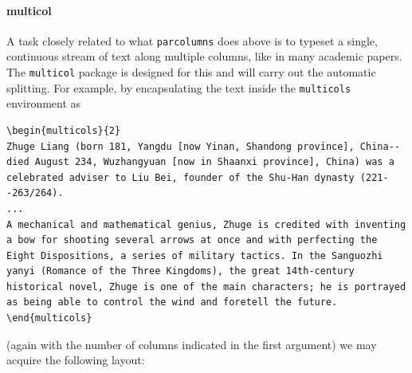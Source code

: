 \paragraph{multicol} A task closely related to what \verb|parcolumns| does above is to typeset a single, continuous stream of text along multiple columns, like in many academic papers. The \texttt{multicol} package is designed for this and will carry out the automatic splitting. For example, by encapsulating the text inside the \verb|multicols| environment as
\begin{lstlisting}
\begin{multicols}{2}
Zhuge Liang (born 181, Yangdu [now Yinan, Shandong province], China--died August 234, Wuzhangyuan [now in Shaanxi province], China) was a celebrated adviser to Liu Bei, founder of the Shu-Han dynasty (221--263/264).
...
A mechanical and mathematical genius, Zhuge is credited with inventing a bow for shooting several arrows at once and with perfecting the Eight Dispositions, a series of military tactics. In the Sanguozhi yanyi (Romance of the Three Kingdoms), the great 14th-century historical novel, Zhuge is one of the main characters; he is portrayed as being able to control the wind and foretell the future.
\end{multicols}
\end{lstlisting}
(again with the number of columns indicated in the first argument) we may acquire the following layout:
